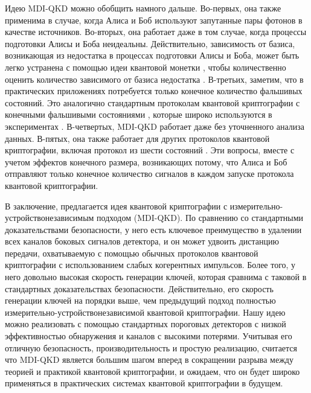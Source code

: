 Идею MDI-QKD можно обобщить намного дальше. Во-первых, она также применима в случае, когда Алиса и Боб используют запутанные пары фотонов в качестве источников. Во-вторых, она работает даже в том случае, когда процессы подготовки Алисы и Боба неидеальны. Действительно, зависимость от базиса, возникающая из недостатка в процессах подготовки Алисы и Боба, может быть легко устранена с помощью идеи квантовой монетки \cite{gottesman2004,koashi2005}, чтобы количественно оценить количество зависимого от базиса недостатка \cite{tamaki2012}. В-третьих, заметим, что в практических приложениях потребуется только конечное количество фальшивых состояний. Это аналогично стандартным протоколам квантовой криптографии с конечными фальшивыми состояниями \cite{ma2005}, которые широко используются в экспериментах \cite{rosenberg2009}. В-четвертых, MDI-QKD работает даже без уточненного анализа данных. В-пятых, она также работает для других протоколов квантовой криптографии, включая протокол из шести состояний \cite{fuchs1997}. Эти вопросы, вместе с учетом эффектов конечного размера, возникающих потому, что Алиса и Боб отправляют только конечное количество сигналов в каждом запуске протокола квантовой криптографии\cite{tamaki2012}.

В заключение, предлагается идея квантовой криптографии с измерительно-устройствонезависимым подходом (MDI-QKD). По сравнению со стандартными доказательствами безопасности, у него есть ключевое преимущество в удалении всех каналов боковых сигналов детектора, и он может удвоить дистанцию передачи, охватываемую с помощью обычных протоколов квантовой криптографии с использованием слабых когерентных импульсов. Более того, у него довольно высокая скорость генерации ключей, которая сравнима с таковой в стандартных доказательствах безопасности. Действительно, его скорость генерации ключей на порядки выше, чем предыдущий подход полностью измерительно-устройствонезависимой квантовой криптографии. Нашу идею можно реализовать с помощью стандартных пороговых детекторов с низкой эффективностью обнаружения и каналов с высокими потерями. Учитывая его отличную безопасность, производительность и простую реализацию, считается что MDI-QKD является большим шагом вперед в сокращении разрыва между теорией и практикой квантовой криптографии, и ожидаем, что он будет широко применяться в практических системах квантовой криптографии в будущем.
